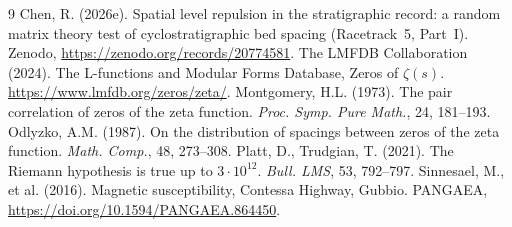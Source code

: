 \documentclass[12pt,a4paper]{article}
\begin{document}
\begin{thebibliography}{9}
 Chen, R. (2026e). Spatial level repulsion in the stratigraphic record: a random matrix theory test of cyclostratigraphic bed spacing (Racetrack~5, Part~I). Zenodo, \url{https://zenodo.org/records/20774581}.
 The LMFDB Collaboration (2024). The L-functions and Modular Forms Database, Zeros of $\zeta(s)$. \url{https://www.lmfdb.org/zeros/zeta/}.
 Montgomery, H.L. (1973). The pair correlation of zeros of the zeta function. \textit{Proc. Symp. Pure Math.}, 24, 181--193.
 Odlyzko, A.M. (1987). On the distribution of spacings between zeros of the zeta function. \textit{Math. Comp.}, 48, 273--308.
 Platt, D., Trudgian, T. (2021). The Riemann hypothesis is true up to $3\cdot10^{12}$. \textit{Bull. LMS}, 53, 792--797.
 Sinnesael, M., et al. (2016). Magnetic susceptibility, Contessa Highway, Gubbio. PANGAEA, \url{https://doi.org/10.1594/PANGAEA.864450}.
\end{thebibliography}
\end{document}
